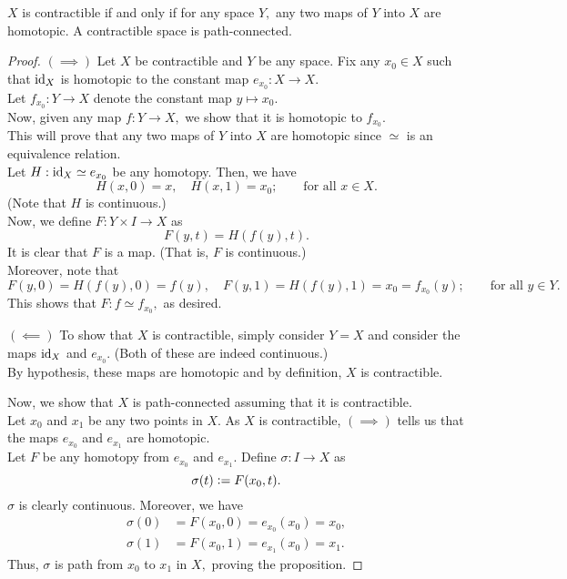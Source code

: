 \documentclass[12pt]{article}
\begin{document}
\begin{prop} \label{prop:contracpath} %
	$X$ is contractible if and only if for any space $Y,$ any two maps of $Y$ into $X$ are homotopic. A contractible space is path-connected.
\end{prop}
\begin{proof} 
	$(\implies)$ Let $X$ be contractible and $Y$ be any space. Fix any $x_0 \in X$ such that $\operatorname{id}_X$ is homotopic to the constant map $e_{x_0}:X\to X.$ \\
	Let $f_{x_0}:Y\to X$ denote the constant map $y \mapsto x_0.$\\
	Now, given any map $f:Y\to X,$ we show that it is homotopic to $f_{x_0}.$ \\This will prove that any two maps of $Y$ into $X$ are homotopic since $\simeq$ is an equivalence relation.\\
	Let $H:\operatorname{id}_X \simeq e_{x_0}$ be any homotopy. Then, we have
	\begin{equation*} 
		H(x, 0) = x,\quad H(x, 1) = x_0; \qquad \text{for all } x \in X.
	\end{equation*}
	(Note that $H$ is continuous.)\\
	Now, we define $F:Y\times I \to X$ as
	\begin{equation*} 
		F(y, t) = H(f(y), t).
	\end{equation*}
	It is clear that $F$ is a map. (That is, $F$ is continuous.)\\
	Moreover, note that
	\begin{equation*} 
		F(y, 0) = H(f(y), 0) = f(y), \quad F(y, 1) = H(f(y), 1) = x_0 = f_{x_0}(y); \qquad \text{for all } y \in Y.
	\end{equation*}
	This shows that $F:f\simeq f_{x_0},$ as desired.

	$(\impliedby)$ To show that $X$ is contractible, simply consider $Y = X$ and consider the maps $\operatorname{id}_X$ and $e_{x_0}.$ (Both of these are indeed continuous.)\\
	By hypothesis, these maps are homotopic and by definition, $X$ is contractible.

	Now, we show that $X$ is path-connected assuming that it is contractible.\\
	Let $x_0$ and $x_1$ be any two points in $X.$ As $X$ is contractible, $(\implies)$ tells us that the maps $e_{x_0}$ and $e_{x_1}$ are homotopic. \\
	Let $F$ be any homotopy from $e_{x_0}$ and $e_{x_1}.$ Define $\sigma:I\to X$ as 
	\begin{equation*} 
		\sigma(t) \vcentcolon= F(x_0, t).
	\end{equation*}
	$\sigma$ is clearly continuous. Moreover, we have
	\begin{align*} 
		\sigma(0) &= F(x_0, 0) = e_{x_0}(x_0) = x_0,\\
		\sigma(1) &= F(x_0, 1) = e_{x_1}(x_0) = x_1.
	\end{align*}
	Thus, $\sigma$ is path from $x_0$ to $x_1$ in $X,$ proving the proposition.
\end{proof}
\end{document}
